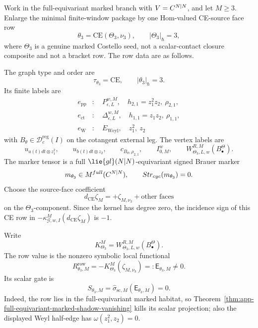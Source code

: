 \begin{prop}\label{prop:concrete-order-three-larger-package-row}
  Work in the full-equivariant marked branch with \(V=C^{N|N}\), and let
  \(M\geq3\).  Enlarge the minimal finite-window package by one Hom-valued
  CE-source face row
  \[
    \theta_3=\mathrm{CE}(\Theta_3,\nu_3),
    \qquad |\Theta_3|_\hbar=3,
  \]
  where \(\Theta_3\) is a genuine marked Costello seed, not a
  scalar-contact closure composite and not a bracket row.  The row data are
  as follows.

  The graph type and order are
  \[
    \tau_{\theta_3}=\mathrm{CE},\qquad |\theta_3|_\hbar=3.
  \]
  Its finite labels are
  \[
  \begin{aligned}
    e_{\mathrm{pp}}&:\quad
      P_{\epsilon,L}^{w,M},\quad
      h_{2,1}=z_1^2z_2,\ \rho_{2,1},\\
    e_{\mathrm{ct}}&:\quad
      \Delta_{\epsilon,L}^{w,M},\quad
      h_{1,1}=z_1z_2,\ \rho_{1,1},\\
    e_{\mathrm{W}}&:\quad
      E_{\mathrm{Weyl}},\quad
      z_1^2,\ z_2
  \end{aligned}
  \]
  with \(B_\theta\in\mathcal D^{\mathrm{reg}}_c(I)\) on the cotangent
  external leg.  The vertex labels are
  \[
    u_{a(t)dt\otimes z_1^2},\qquad
    u_{b(t)dt\otimes z_2},\qquad
    c_{B_\theta,\rho_{2,1}},\qquad
    I^w_{0,M},\qquad
    W^{R,M}_{\Theta_3,L,w}(B^\Theta_\bullet).
  \]
  The marker tensor is a full
  \(\lie{gl}(N|N)\)-equivariant signed Brauer marker
  \[
    m_{\theta_3}\in
    M^{full}(C^{N|N}),
    \qquad
    Str_{cyc}(m_{\theta_3})=0.
  \]
  Choose the source-face coefficient
  \[
    d_{\mathrm{CE}}\zeta_M
      =
    +\zeta_{M,\nu_3}+\text{other faces}
  \]
  on the \(\Theta_3\)-component.  Since the kernel has degree zero, the
  incidence sign of this CE row in
  \(-\kappa^M_{\mathcal G,w,I}(d_{\mathrm{CE}}\zeta_M)\) is \(-1\).

  Write
  \[
    K^M_{\Theta_3}
      =
    W^{R,M}_{\Theta_3,L,w}(B^\Theta_\bullet).
  \]
  The row value is the nonzero symbolic local functional
  \[
    R^{\mathrm{row}}_{\theta_3,M}
      =
    -K^M_{\Theta_3}(\zeta_{M,\nu_3})
      =:\mathsf E_{\theta_3,M}\neq0.
  \]
  Its scalar gate is
  \[
    S_{\theta_3,M}
      =
    \widehat\sigma_{\mathrm{sc},M}(\mathsf E_{\theta_3,M})=0.
  \]
  Indeed, the row lies in the full-equivariant marked habitat, so
  Theorem~\ref{thm:app-full-equivariant-marked-shadow-vanishing} kills its
  scalar projection; also the displayed Weyl half-edge has
  \(\omega(z_1^2,z_2)=0\).


\end{prop}
